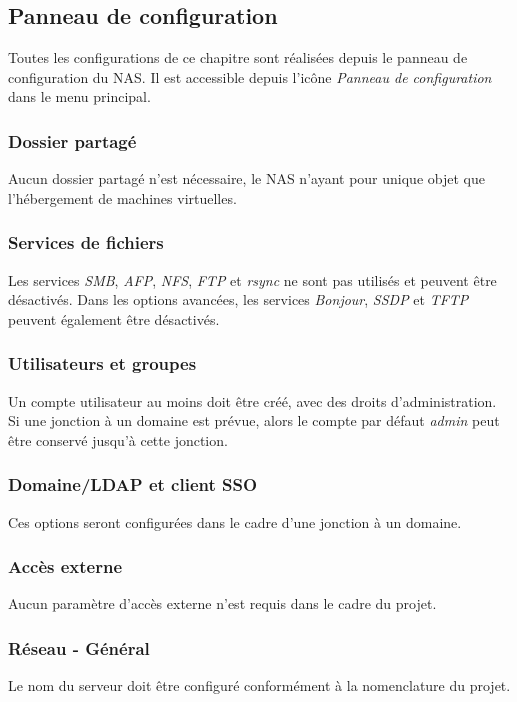 \subsection{Panneau de configuration}
Toutes les configurations de ce chapitre sont réalisées depuis le panneau de configuration du NAS. Il est accessible depuis l'icône \textit{Panneau de configuration} dans le menu principal.

\subsubsection{Dossier partagé}
Aucun dossier partagé n'est nécessaire, le NAS n'ayant pour unique objet que l'hébergement de machines virtuelles.

\subsubsection{Services de fichiers}
Les services \textit{SMB}, \textit{AFP}, \textit{NFS}, \textit{FTP} et \textit{rsync} ne sont pas utilisés et peuvent être désactivés. Dans les options avancées, les services \textit{Bonjour}, \textit{SSDP} et \textit{TFTP} peuvent également être désactivés.

\subsubsection{Utilisateurs et groupes}
Un compte utilisateur au moins doit être créé, avec des droits d'administration. Si une jonction à un domaine est prévue, alors le compte par défaut \textit{admin} peut être conservé jusqu'à cette jonction.

\subsubsection{Domaine/LDAP et client SSO}
Ces options seront configurées dans le cadre d'une jonction à un domaine.

\subsubsection{Accès externe}
Aucun paramètre d'accès externe n'est requis dans le cadre du projet.

\subsubsection{Réseau - Général}
Le nom du serveur doit être configuré conformément à la nomenclature du projet.\\


